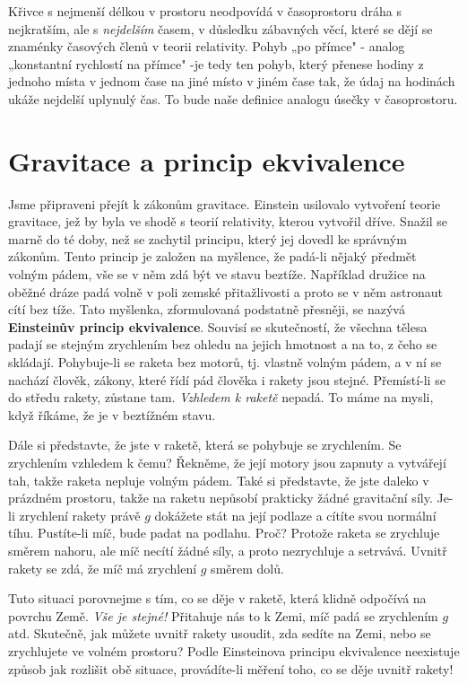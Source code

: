     Křivce s nejmenší délkou v prostoru neodpovídá v časoprostoru dráha s nejkratším, ale s 
    \emph{nejdelším} časem, v důsledku zábavných věcí, které se dějí se znaménky časových členů v 
    teorii relativity. Pohyb „po přímce" - analog „konstantní rychlostí na přímce" -je tedy ten 
    pohyb, který přenese hodiny z jednoho místa v jednom čase na jiné místo v jiném čase tak, že 
    údaj na hodinách ukáže nejdelší uplynulý čas. To bude naše definice analogu úsečky v 
    časoprostoru.
    
  \section{Gravitace a princip ekvivalence}\label{fyz:IIchapXLIIsecV}
    Jsme připraveni přejít k zákonům gravitace. Einstein usilovalo vytvoření teorie gravitace, jež 
    by byla ve shodě s teorií relativity, kterou vytvořil dříve. Snažil se marně do té doby, než se 
    zachytil principu, který jej dovedl ke správným zákonům. Tento princip je založen na myšlence, 
    že padá-li nějaký předmět volným pádem, vše se v něm zdá být ve stavu beztíže. Například 
    družice na oběžné dráze padá volně v poli zemské přitažlivosti a proto se v něm astronaut cítí 
    bez tíže. Tato myšlenka, zformulovaná podstatně přesněji, se nazývá \textbf{Einsteinův princip 
    ekvivalence}. Souvisí se skutečností, že všechna tělesa padají se stejným zrychlením bez ohledu 
    na jejich hmotnost a na to, z čeho se skládají. Pohybuje-li se raketa bez motorů, tj. vlastně 
    volným pádem, a v ní se nachází člověk, zákony, které řídí pád člověka i rakety jsou stejné. 
    Přemístí-li se do středu rakety, zůstane tam. \emph{Vzhledem k raketě} nepadá. To máme na 
    mysli, když říkáme, že je v beztížném stavu.
    
    Dále si představte, že jste v raketě, která se pohybuje se zrychlením. Se zrychlením vzhledem k 
    čemu? Řekněme, že její motory jsou zapnuty a vytvářejí tah, takže raketa nepluje volným pádem. 
    Také si představte, že  jste daleko v prázdném prostoru, takže na raketu nepůsobí prakticky 
    žádné gravitační síly. Je-li zrychlení rakety právě \(g\) dokážete stát na její podlaze a 
    cítíte svou normální tíhu. Pustíte-li míč, bude padat na podlahu. Proč? Protože raketa se 
    zrychluje směrem nahoru, ale míč necítí žádné síly, a proto nezrychluje a setrvává. Uvnitř 
    rakety se zdá, že míč má zrychlení \(g\) směrem dolů.
    
    Tuto situaci porovnejme s tím, co se děje v raketě, která klidně odpočívá na povrchu Země. 
    \emph{Vše je stejné!} Přitahuje nás to k Zemi, míč padá se zrychlením \(g\) atd. Skutečně, jak 
    můžete uvnitř rakety usoudit, zda sedíte na Zemi, nebo se zrychlujete ve volném prostoru? Podle 
    Einsteinova principu ekvivalence neexistuje způsob jak rozlišit obě situace, provádíte-li 
    měření toho, co se děje uvnitř rakety!
    
